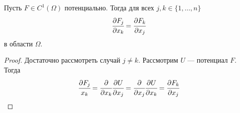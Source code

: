\begin{Statement}
    Пусть $F \in C^1(\Omega)$ потенциально. Тогда для всех $j,k \in \{1, \ldots, n\}$
    $$
        \cfrac{\partial F_j}{\partial x_k} = \cfrac{\partial F_k}{\partial x_j}
    $$
    в области $\Omega$.
\end{Statement}
\begin{proof}
    Достаточно рассмотреть случай $j\neq k$. Рассмотрим $U$ --- потенциал $F$. Тогда
    $$
        \cfrac{\partial F_j}{x_k} = \cfrac{\partial}{\partial x_k}\cfrac{\partial U}{\partial x_j} = \cfrac{\partial}{\partial x_j}\cfrac{\partial U}{\partial x_k} = \cfrac{\partial F_k}{\partial x_j}
    $$
\end{proof}